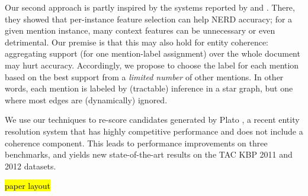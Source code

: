 Our second approach is partly inspired by the systems reported by \cite{Jin:2014} and \cite{Lazic2015}.  There, they showed that per-instance feature selection can help NERD accuracy; for a given mention instance, many context features can be unnecessary or even detrimental.  Our premise is that this may also hold for entity coherence: aggregating support (for one mention-label assignment) over the whole document may hurt accuracy.  Accordingly, we propose to choose the label for each mention based on the best support from a \emph{limited number} of other mentions.  In other words,  each mention is labeled by (tractable) inference in a star graph, but one where most edges are (dynamically) ignored.

We use our techniques to re-score candidates generated by Plato \cite{Lazic2015}, a recent entity resolution system that has highly competitive performance and does not include a coherence component. This leads to performance improvements on three benchmarks, and yields new state-of-the-art results on the TAC KBP 2011 and 2012 datasets.

\hl{paper layout}